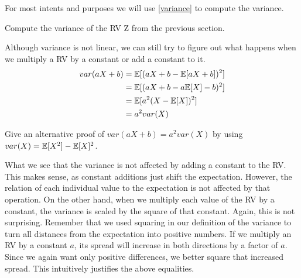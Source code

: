 For most intents and purposes we will use \eqref{variance} to compute the variance. 


\begin{Exercise}
Compute the variance of the RV Z from the previous section.
\end{Exercise}

Although variance is not linear, we can still try to figure out what happens when we multiply a RV by a constant or add a constant to it.
\begin{align}
var(aX+b) &= \mathbb{E}[ (aX+b - \mathbb{E}[aX+b])^2 ] \\
&=\mathbb{E}[ (aX+b - a\mathbb{E}[X] - b)^2 ] \\
&=\mathbb{E}[ a^2 (X-\mathbb{E}[X])^2 ] \\
&= a^2 var(X)
\end{align}

\begin{Exercise}
Give an alternative proof of $var(aX+b) = a^2 var(X)$ by using $var(X)
= \mathbb{E}[X^{2}] - \mathbb{E}[X]^{2}$.
\end{Exercise}

What we see that the variance is not affected by adding a constant to the RV. This makes sense, as constant additions just shift
the expectation. However, the relation of each individual value to the expectation is not affected by that operation. On the other hand,
when we multiply each value of the RV by a constant, the variance is scaled by the square of that constant. Again, this is not surprising.
Remember that we used squaring in our definition of the variance to turn all distances from the expectation into positive numbers.
If we multiply an RV by a constant $ a $, its spread will increase in both directions by a factor of $ a $. 
Since we again want only positive differences,
we better square that increased spread. This intuitively justifies the above equalities.



